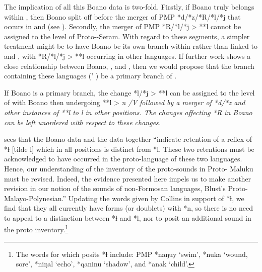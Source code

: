 
The implication of all this Boano data is two-fold.
Firstly, if Boano truly belongs within ,
then Boano split off before the merger of PMP *d/*z/*R/*l/*j
that occurs in 
and  (see ).
Secondly, the merger of PMP *R/*l/*j > **l cannot be assigned
to the level of Proto--Seram.
With regard to these segments,
a simpler treatment might be to have Boano be its own branch
within  rather than linked to 
and , with *R/*l/*j > **l occurring in other  languages.
If further work shows a close relationship between Boano,
, and , then we would propose that the branch
containing these languages (\citeauthor{Collins1983}' ) be a primary
branch of .

If Boano is a primary branch,
the change *l/*j > **l can be assigned to the level of 
with Boano then undergoing **l > \it{n} /V\tsc{[+high]} followed
by a merger of *d/*z
and other instances of **l to \it{l} in other positions.
The changes affecting *R in Boano can be left unordered with
respect to these changes.

\citet[95--97]{Collins1983} sees that the Boano data
and the  data together “indicate retention of a reflex
of *ɫ [tilde l] which in all positions is distinct from *l.
These two retentions must be acknowledged to have occurred in
the proto-language of these two languages.
Hence, our understanding of the inventory of the proto-sounds
in Proto- Maluku must be revised.
Indeed, the  evidence presented here impels us to make
another revision in our notion of the sounds of non-Formosan
languages, Blust’s Proto-Malayo-Polynesian.” Updating the words given by
Collins in support of *ɫ,
we find that they all currently have forms (or doublets) with
*n, so there is no need to appeal to a distinction between *ɫ
and *l, nor to posit an additional sound in the proto inventory.\footnote{
		The words for which \citet[96--97]{Collins1983} posits *ɫ include:
		PMP *naŋuy ‘swim’, *nuka ‘wound, sore’, *niŋal ‘echo’, *qaninu ‘shadow’,
		and *anak ‘child’.} 
